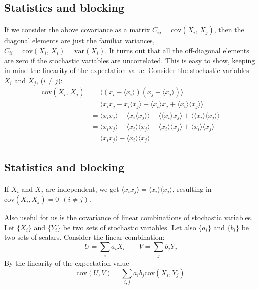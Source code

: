 \documentclass[%
twoside,                 %
final,                   %
10pt]{article}
\begin{document}
\subsection*{Statistics and blocking}

\paragraph{}
If we consider the above covariance as a matrix $C_{ij}=\mathrm{cov}(X_i,\,X_j)$, then the diagonal elements are just the familiar
variances, $C_{ii} = \mathrm{cov}(X_i,\,X_i) = \mathrm{var}(X_i)$. It turns out that
all the off-diagonal elements are zero if the stochastic variables are
uncorrelated. This is easy to show, keeping in mind the linearity of
the expectation value. Consider the stochastic variables $X_i$ and
$X_j$, ($i\neq j$):
\begin{align}
\mathrm{cov}(X_i,\,X_j) &= \langle(x_i-\langle x_i\rangle)(x_j-\langle x_j\rangle)\rangle\\
&=\langle x_i x_j - x_i\langle x_j\rangle - \langle x_i\rangle x_j + \langle x_i\rangle\langle x_j\rangle\rangle \\
&=\langle x_i x_j\rangle - \langle x_i\langle x_j\rangle\rangle - \langle \langle x_i\rangle x_j\rangle +
\langle \langle x_i\rangle\langle x_j\rangle\rangle\\
&=\langle x_i x_j\rangle - \langle x_i\rangle\langle x_j\rangle - \langle x_i\rangle\langle x_j\rangle +
\langle x_i\rangle\langle x_j\rangle\\
&=\langle x_i x_j\rangle - \langle x_i\rangle\langle x_j\rangle
\end{align}





\subsection*{Statistics and blocking}

\paragraph{}
If $X_i$ and $X_j$ are independent, we get 
$\langle x_i x_j\rangle =\langle x_i\rangle\langle x_j\rangle$, resulting in $\mathrm{cov}(X_i, X_j) = 0\ \ (i\neq j)$.

Also useful for us is the covariance of linear combinations of
stochastic variables. Let $\{X_i\}$ and $\{Y_i\}$ be two sets of
stochastic variables. Let also $\{a_i\}$ and $\{b_i\}$ be two sets of
scalars. Consider the linear combination:
\[
U = \sum_i a_i X_i \qquad V = \sum_j b_j Y_j
\]
By the linearity of the expectation value
\[
\mathrm{cov}(U, V) = \sum_{i,j}a_i b_j \mathrm{cov}(X_i, Y_j)
\]
\end{document}
